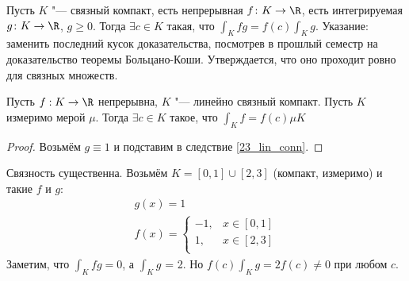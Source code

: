 \begin{Exercise}
	Пусть $K$ "--- связный компакт, есть непрерывная $f \colon K \to \R$,
	есть интегрируемая $g \colon K \to \R$, $g \ge 0$.
	Тогда $\exists c \in K$ такая, что $\int_K fg = f(c) \int_K g$.
	Указание: заменить последний кусок доказательства, посмотрев в прошлый семестр на доказательство теоремы Больцано-Коши.
	Утверждается, что оно проходит ровно для связных множеств.
\end{Exercise}
\begin{conseq}
	Пусть $f : K \to \R$ непрерывна, $K$ "--- линейно связный компакт.
	Пусть $K$ измеримо мерой $\mu$.
	Тогда $\exists c \in K$ такое, что $\int_K f = f(c) \mu K$
\end{conseq}
\begin{proof}
	Возьмём $g \equiv 1$ и подставим в следствие \ref{23_lin_conn}.
\end{proof}
\begin{exmp}
	Связность существенна.
	Возьмём $K = [0,1] \cup [2,3]$ (компакт, измеримо) и такие $f$ и $g$:
	\begin{gather*}
	g(x) = 1 \\
	f(x) = \begin{cases}
		-1, & x \in [0,1] \\
		1, & x \in [2,3] \\
	\end{cases}
	\end{gather*}
	Заметим, что $\int_K fg = 0$, а $\int_K g$ = 2.
	Но $f(c) \int_K g = 2f(c) \neq 0$ при любом $c$.
\end{exmp}

